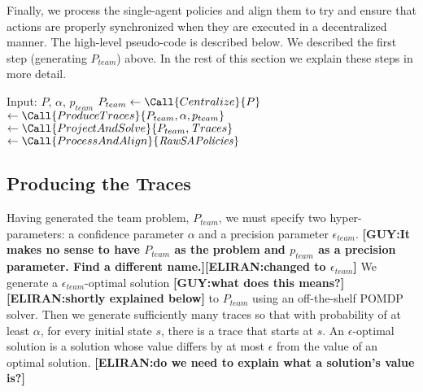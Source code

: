 \documentclass[letterpaper]{article} %
\newcommand{\eliran}[1]{\textbf{[\color{red}ELIRAN:#1]}}
\newcommand{\ronen}[1]{\textbf{[\color{blue}RONEN:#1]}}
\newcommand{\guy}[1]{\textbf{[\color{orange}GUY:#1]}}
\begin{document}
Finally, we process the single-agent policies and align them to try and ensure that actions are properly synchronized when they are executed in a decentralized manner. The high-level pseudo-code is described below. We described the first step (generating $P_{team}$) above. In the rest of this section we explain these steps in more detail.


\begin{algorithm}
\caption{GenerateAgentPolicies \guy{This pseudo code is pretty useless. It just lists the phases. I don't think that it adds anything.} }
\begin{algorithmic}[tbph]
\State Input: $P$, $\alpha$, $p_{team}$
\State $P_{team} \gets \Call{Centralize}{P}$
 $\gets \Call{ProduceTraces}{P_{team}, \alpha, p_{team}}$
$ \gets \Call{ProjectAndSolve}{P_{team},{\mathit Traces}}$
 $\gets \Call{ProcessAndAlign}{\mathit{RawSAPolicies}}$
\end{algorithmic}
\end{algorithm}

\subsection{Producing the Traces}

Having generated the team problem, $P_{team}$, we 
must specify two hyper-parameters: a confidence parameter $\alpha$ and a precision parameter $\epsilon_{team}$. \guy{It makes no sense to have $P_{team}$ as the problem and $p_{team}$ as a precision parameter. Find a different name.}\eliran{changed to $\epsilon_{team}$} We generate a $\epsilon_{team}$-optimal solution \guy{what does this means?}\eliran{shortly explained below}
to $P_{team}$ using an off-the-shelf POMDP solver.
Then we generate sufficiently many traces so that with probability of at least $\alpha$, for every initial state $s$, there is a trace that starts at $s$. An $\epsilon$-optimal solution is a solution whose value differs by at most $\epsilon$ from the value of an optimal solution. \eliran{do we need to explain what a solution's value is?}
\end{document}
